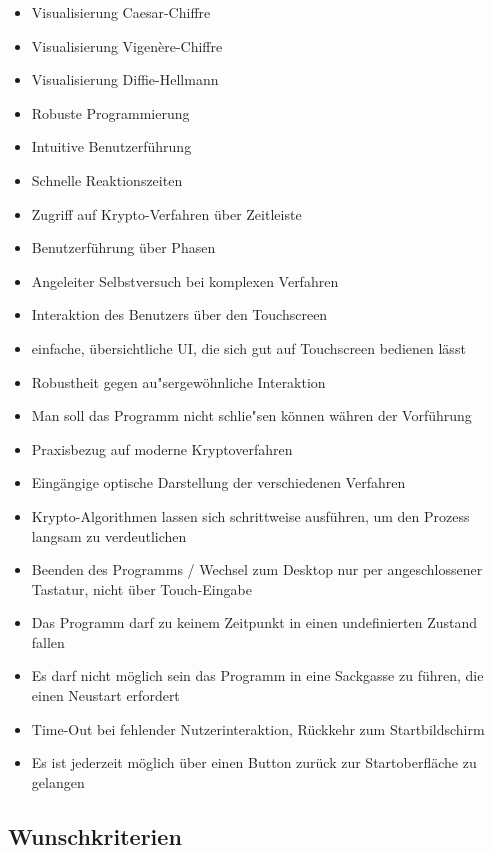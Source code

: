 \documentclass{article}
\begin{document}
\begin{itemize}
    \item Visualisierung Caesar-Chiffre
    \item Visualisierung Vigenère-Chiffre
    \item Visualisierung Diffie-Hellmann
    \item Robuste Programmierung
    \item Intuitive Benutzerführung
    \item Schnelle Reaktionszeiten
    \item Zugriff auf Krypto-Verfahren über Zeitleiste
    \item Benutzerführung über Phasen
    \item Angeleiter Selbstversuch bei komplexen Verfahren
    \item Interaktion des Benutzers über den Touchscreen
    \item einfache, übersichtliche UI, die sich gut auf Touchscreen bedienen lässt
    \item Robustheit gegen au"sergewöhnliche Interaktion
    \item Man soll das Programm nicht schlie"sen können währen der Vorführung
    \item Praxisbezug auf moderne Kryptoverfahren
    \item Eingängige optische Darstellung der verschiedenen Verfahren
    \item Krypto-Algorithmen lassen sich schrittweise ausführen, um den Prozess
        langsam zu verdeutlichen
    \item Beenden des Programms / Wechsel zum Desktop nur per angeschlossener Tastatur, nicht über Touch-Eingabe
    \item Das Programm darf zu keinem Zeitpunkt in einen undefinierten Zustand fallen
    \item Es darf nicht möglich sein das Programm in eine Sackgasse zu führen, die einen Neustart erfordert
    \item Time-Out bei fehlender Nutzerinteraktion, Rückkehr zum Startbildschirm
    \item Es ist jederzeit möglich über einen Button zurück zur Startoberfläche zu gelangen
\end{itemize}

\subsection{Wunschkriterien}
\end{document}
